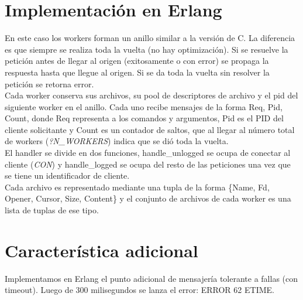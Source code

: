 \documentclass[a4paper,12pt]{article}
\begin{document}
    
\section*{Implementación en Erlang}
    En este caso los workers forman un anillo similar a la versión de C. La diferencia es que siempre se realiza toda la vuelta (no hay optimización). Si se resuelve la petición antes de llegar al origen (exitosamente o con error) se propaga la respuesta hasta que llegue al origen. Si se da toda la vuelta sin resolver la petición se retorna error.\\
    Cada worker conserva sus archivos, su pool de descriptores de archivo y el pid del siguiente worker en el anillo. Cada uno recibe mensajes de la forma {Req, Pid, Count}, donde Req representa a los comandos y argumentos, Pid es el PID del cliente solicitante y Count es un contador de saltos, que al llegar al número total de workers (\textit{?N\_WORKERS}) indica que se dió toda la vuelta.\\
    El handler se divide en dos funciones, handle\_unlogged se ocupa de conectar al cliente (\textit{CON}) y handle\_logged se ocupa del resto de las peticiones una vez que se tiene un identificador de cliente.\\
    Cada archivo es representado mediante una tupla de la forma \{Name, Fd, Opener, Cursor, Size, Content\} y el conjunto de archivos de cada worker es una lista de tuplas de ese tipo.

\section*{Característica adicional}
    Implementamos en Erlang el punto adicional de mensajería tolerante a fallas (con timeout). Luego de 300 milisegundos se lanza el error: ERROR 62 ETIME.\\
\end{document}
